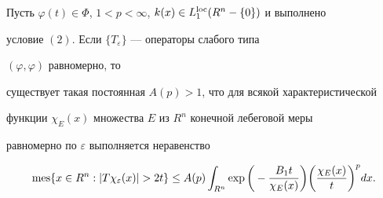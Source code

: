 \begin{thm} 


Пусть $\varphi(t)\in\Phi$, $1<p<\infty$, $k(x)\in 


L^{\loc}_1(R^n-\{0\})$ и выполнено 


условие $(2)$. Если $\{T_\varepsilon\}$ --- операторы слабого типа 


$(\varphi,\varphi)$ равномерно, то 


существует такая постоянная $A(p)>1$, что для всякой характеристической 


функции $\chi_E(x)$ множества $E$ из $R^n$ конечной лебеговой меры 


равномерно по $\varepsilon$ выполняется неравенство 


\begin{equation} 


\mes\{x\in R^n:|T \chi_\varepsilon(x)|>2t\}\le A(p)\int_{R^n}\exp 


\bigg(-\frac{B_1t}{\chi_E(x)} \bigg) 


\bigg(\frac{\chi_E(x)}{t} \bigg)^p d x. 


\end{equation} 


\end{thm} 


 


